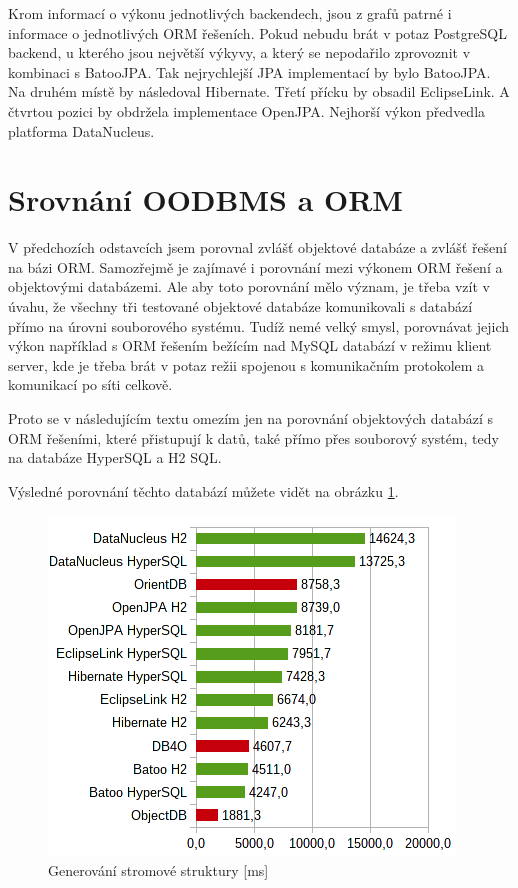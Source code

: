 Krom informací o výkonu jednotlivých backendech, jsou z grafů patrné i informace o jednotlivých ORM řešeních. Pokud nebudu brát v potaz PostgreSQL backend, u kterého jsou největší výkyvy, a který se nepodařilo zprovoznit v kombinaci s BatooJPA. Tak nejrychlejší JPA implementací by bylo BatooJPA. Na druhém místě by následoval Hibernate. Třetí přícku by obsadil EclipseLink. A čtvrtou pozici by obdržela implementace OpenJPA. Nejhorší výkon předvedla platforma DataNucleus.

\section{Srovnání OODBMS a ORM}
V předchozích odstavcích jsem porovnal zvlášť objektové databáze a zvlášť řešení na bázi ORM. Samozřejmě je zajímavé i porovnání mezi výkonem ORM řešení a objektovými databázemi. Ale aby toto porovnání mělo význam, je třeba vzít v úvahu, že všechny tři testované objektové databáze komunikovali s databází přímo na úrovni souborového systému. Tudíž nemé velký smysl, porovnávat jejich výkon například s ORM řešením bežícím nad MySQL databází v režimu klient server, kde je třeba brát v potaz režii spojenou s komunikačním protokolem a komunikací po síti celkově.

Proto se v následujícím textu omezím jen na porovnání objektových databází s ORM řešeními, které přistupují k datů, také přímo přes souborový systém, tedy na databáze HyperSQL a H2 SQL.

Výsledné porovnání těchto databází můžete vidět na obrázku \ref{img:resultf}.
\begin{figure}[!h]
  \includegraphics[]{obr/bench/resultf}
  \caption{Generování stromové struktury [ms]}\label{img:resultf}
\end{figure}
